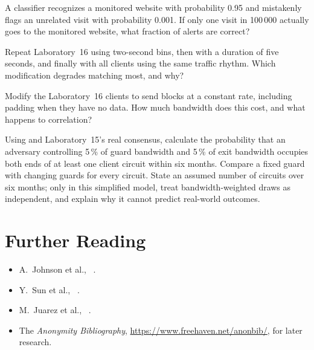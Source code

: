 \begin{esercizio}[1]\label{es:26-base}
A classifier recognizes a monitored website with probability 0.95 and mistakenly flags an unrelated visit with probability 0.001. If only one visit in 100\,000 actually goes to the monitored website, what fraction of alerts are correct?
\end{esercizio}

\begin{esercizio}[2]\label{es:26-bin}
Repeat Laboratory~16 using two-second bins, then with a duration of five seconds, and finally with all clients using the same traffic rhythm. Which modification degrades matching most, and why?
\end{esercizio}

\begin{esercizio}[2]\label{es:26-difesa}
Modify the Laboratory~16 clients to send blocks at a constant rate, including padding when they have no data. How much bandwidth does this cost, and what happens to correlation?
\end{esercizio}

\begin{esercizio}[3]\label{es:26-probabilita}
Using  and Laboratory~15's real consensus, calculate the probability that an adversary controlling 5\,\% of guard bandwidth and 5\,\% of exit bandwidth occupies both ends of at least one client circuit within six months. Compare a fixed guard with changing guards for every circuit. State an assumed number of circuits over six months; only in this simplified model, treat bandwidth-weighted draws as independent, and explain why it cannot predict real-world outcomes.
\end{esercizio}

\section*{Further Reading}
\begin{itemize}
  \item A.~Johnson et al., ~\cite{johnson2013users}.
  \item Y.~Sun et al., ~\cite{sun2015raptor}.
  \item M.~Juarez et al., ~\cite{juarez2014critical}.
  \item The \emph{Anonymity Bibliography}, \url{https://www.freehaven.net/anonbib/}, for later research.
\end{itemize}
